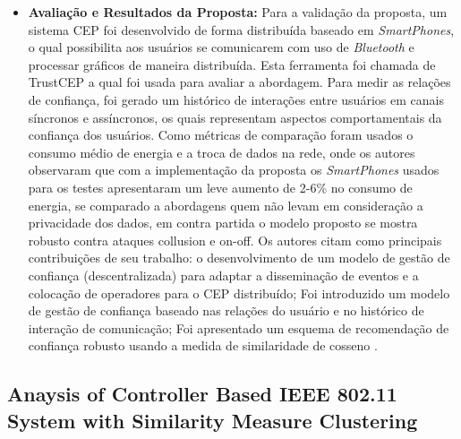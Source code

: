 \documentclass[tid,table]{texufpel} %
\begin{document}
\begin{itemize}
	
	\item \textbf{Avaliação e Resultados da Proposta:} Para a validação da proposta, um sistema CEP foi desenvolvido de forma distribuída baseado em \textit{SmartPhones}, o qual possibilita aos usuários se comunicarem com uso de \textit{Bluetooth} e processar gráficos de maneira distribuída. Esta ferramenta foi chamada de TrustCEP a qual foi usada para avaliar a abordagem. Para medir as relações de confiança, foi gerado um histórico de interações entre usuários em canais síncronos e assíncronos, os quais representam aspectos comportamentais da confiança dos usuários. Como métricas de comparação foram usados o consumo médio de energia e a troca de dados na rede, onde os autores observaram que com a implementação da proposta os \textit{SmartPhones} usados para os testes apresentaram um leve aumento de 2-6\% no consumo de energia, se comparado a abordagens quem não levam em consideração a privacidade dos dados, em contra partida o modelo proposto se mostra robusto contra ataques collusion e on-off.
	Os autores citam como principais contribuições de seu trabalho: o desenvolvimento de um modelo de gestão de confiança (descentralizada) para adaptar a disseminação de eventos e a colocação de operadores para o CEP distribuído; Foi introduzido um modelo de gestão de confiança baseado nas relações do usuário e no histórico de interação de comunicação; Foi apresentado um esquema de recomendação de confiança robusto usando a medida de similaridade de cosseno \cite{art6dwarakanath2017trustcep}.
	
	
\end{itemize}

\subsection{Anaysis of Controller Based IEEE 802.11 System with Similarity Measure Clustering}
\end{document}
